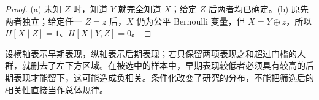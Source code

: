 \documentclass[lang=cn,a4paper,fontset=none,zihao=false,10pt,openany,twoside]{beautybook}
\numberwithin{algorithm}{chapter}
\begin{document}
\begin{proof}
(a) 未知 $Z$ 时，知道 $Y$ 就完全知道 $X$；给定 $Z$ 后两者均已确定。(b) 原先两者独立；给定任一 $Z=z$ 后，$X$ 仍为公平 Bernoulli 变量，但 $X=Y\oplus z$，所以 $H[X\mid Z]=1$、$H[X\mid Y,Z]=0$。
\end{proof}
\begin{remark}[筛选也会改变依赖关系]
设横轴表示早期表现，纵轴表示后期表现；若只保留两项表现之和超过门槛的人群，就删去了左下方区域。在被选中的样本中，早期表现较低者必须具有较高的后期表现才能留下，这可能造成负相关。条件化改变了研究的分布，不能把筛选后的相关性直接当作总体规律。
\begin{center}
\end{center}
\end{remark}
\end{document}
